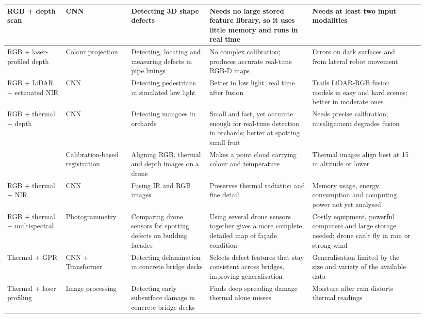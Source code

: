 {\begin{xltabular}{\textwidth}{>{\RaggedRight\arraybackslash}p{1.6cm}>{\RaggedRight\arraybackslash}p{2.2cm}>{\RaggedRight\arraybackslash}p{2.3cm}>{\RaggedRight\arraybackslash}X>{\RaggedRight\arraybackslash}Xp{0.95cm}}
\midrule
RGB + depth scan & CNN & Detecting 3D shape defects & Needs no large stored feature library, so it uses little memory and runs in real time & Needs at least two input modalities & \citep{Asad2026} \\
\midrule
RGB + laser-profiled depth & Colour projection & Detecting, locating and measuring defects in pipe linings & No complex calibration; produces accurate real-time RGB-D maps & Errors on dark surfaces and from lateral robot movement & \citep{Gunatilake2021} \\
\midrule
RGB + LiDAR + estimated NIR & CNN & Detecting pedestrians in simulated low light & Better in low light; real time after fusion & Trails LiDAR-RGB fusion models in easy and hard scenes; better in moderate ones & \citep{Wu2025} \\
\midrule
RGB + thermal + depth & CNN & Detecting mangoes in orchards & Small and fast, yet accurate enough for real-time detection in orchards; better at spotting small fruit & Needs precise calibration; misalignment degrades fusion & \citep{Cao2026} \\
 & Calibration-based registration & Aligning RGB, thermal and depth images on a drone & Makes a point cloud carrying colour and temperature & Thermal images align best at 15 m altitude or lower & \citep{Nooralishahi2022} \\
\midrule
RGB + thermal + NIR & CNN & Fusing IR and RGB images & Preserves thermal radiation and fine detail & Memory usage, energy consumption and computing power not yet analysed & \citep{Laidouni2025} \\
\midrule
RGB + thermal + multispectral & Photogrammetry & Comparing drone sensors for spotting defects on building facades & Using several drone sensors together gives a more complete, detailed map of façade condition & Costly equipment, powerful computers and large storage needed; drone can't fly in rain or strong wind & \citep{Guedes2025} \\
\midrule
Thermal + GPR & CNN + Transformer & Detecting delamination in concrete bridge decks & Selects defect features that stay consistent across bridges, improving generalisation & Generalisation limited by the size and variety of the available data & \citep{Rashidi2026} \\
\midrule
Thermal + laser profiling & Image processing & Detecting early subsurface damage in concrete bridge decks & Finds deep spreading damage thermal alone misses & Moisture after rain distorts thermal readings & \citep{Yamashita2025} \\

\end{xltabular}}
